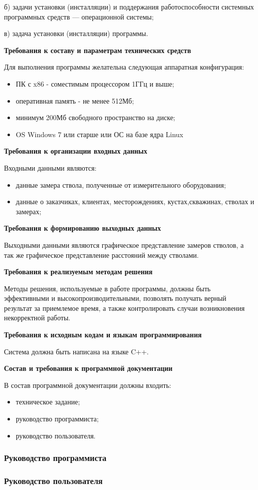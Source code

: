 б) задачи установки (инсталляции) и поддержания работоспособности системных программных средств — операционной системы;

в) задача установки (инсталляции) программы.

\textbf{Требования к составу и параметрам технических средств}

Для выполнения программы желательна следующая аппаратная конфигурация:

\begin{itemize}
  \item ПК с x86 - соместимым процессором 1ГГц и выше;
  \item оперативная память - не менее 512Мб;
  \item минимум 200Мб свободного пространство на диске;
  \item OS Windows 7 или старше или ОС на базе ядра Linux
\end{itemize}

\textbf{Требования к организации входных данных}

Входными данными являются:
\begin{itemize}
  \item данные замера ствола, полученные от измерительного оборудования;
  \item данные о заказчиках, клиентах, месторождениях, кустах,скважинах, стволах и замерах;
\end{itemize}

\textbf{Требования к формированию выходных данных}

Выходными данными являются графическое представление замеров стволов, а так же графическое представление расстояний
между стволами.

\textbf{Требования к реализуемым методам решения}

Методы решения, используемые в работе программы, должны быть эффективными и высокопроизводительными,
позволять получать верный результат за приемлемое время, а также контролировать случаи возникновения некорректной работы.

\textbf{Требования к исходным кодам и языкам программирования}

Система должна быть написана на языке C++.

\textbf{Состав и требования к программной документации}

В состав программной документации должны входить:
\begin{itemize}
  \item техническое задание;
  \item руководство программиста;
  \item руководство пользователя.
\end{itemize}

\subsubsection*{Руководство программиста}

\subsubsection*{Руководство пользователя}

